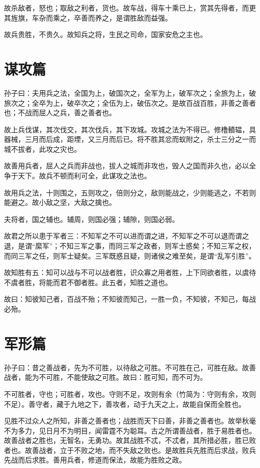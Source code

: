 \documentclass[UTF8]{ctexart}
\begin{document}
	故杀敌者，怒也；取敌之利者，货也。故车战，得车十乘已上，赏其先得者，而更其旌旗，车杂而乘之，卒善而养之，是谓胜敌而益强。
	
	故兵贵胜，不贵久。故知兵之将，生民之司命，国家安危之主也。
	
	\newpage
	\section{谋攻篇}
	
	孙子曰：夫用兵之法，全国为上，破国次之，全军为上，破军次之；全旅为上，破旅次之；全卒为上，破卒次之；全伍为上，破伍次之。是故百战百胜，非善之善者也；不战而屈人之兵，善之善者也。
	
	故上兵伐谋，其次伐交，其次伐兵，其下攻城。攻城之法为不得已。修橹轒辒，具器械，三月而后成，距堙，又三月而后已。将不胜其忿而蚁附之，杀士三分之一而城不拔者，此攻之灾也。
	
	故善用兵者，屈人之兵而非战也，拔人之城而非攻也，毁人之国而非久也，必以全争于天下。故兵不顿而利可全，此谋攻之法也。
	
	故用兵之法，十则围之，五则攻之，倍则分之，敌则能战之，少则能逃之，不若则能避之。故小敌之坚，大敌之擒也。
	
	夫将者，国之辅也。辅周，则国必强；辅隙，则国必弱。
	
	故君之所以患于军者三：不知军之不可以进而谓之进，不知军之不可以退而谓之退，是谓“縻军”；不知三军之事，而同三军之政者，则军士惑矣；不知三军之权，而同三军之任，则军士疑矣。三军既惑且疑，则诸侯之难至矣，是谓“乱军引胜”。
	
	故知胜有五：知可以战与不可以战者胜，识众寡之用者胜，上下同欲者胜，以虞待不虞者胜，将能而君不御者胜。此五者，知胜之道也。
	
	故曰：知彼知己者，百战不殆；不知彼而知己，一胜一负，不知彼，不知己，每战必殆。
	
	\newpage
	\section{军形篇}
	
	孙子曰：昔之善战者，先为不可胜，以待敌之可胜。不可胜在己，可胜在敌。故善战者，能为不可胜，不能使敌之可胜。故曰：胜可知，而不可为。
	
	不可胜者，守也；可胜者，攻也。守则不足，攻则有余（竹简为：守则有余，攻则不足）。善守者，藏于九地之下，善攻者，动于九天之上，故能自保而全胜也。
	
	见胜不过众人之所知，非善之善者也；战胜而天下曰善，非善之善者也。故举秋毫不为多力，见日月不为明目，闻雷霆不为聪耳。古之所谓善战者，胜于易胜者也。故善战者之胜也，无智名，无勇功。故其战胜不忒，不忒者，其所措必胜，胜已败者也。故善战者，立于不败之地，而不失敌之败也。是故胜兵先胜而后求战，败兵先战而后求胜。善用兵者，修道而保法，故能为胜败之政。
	
\end{document}
